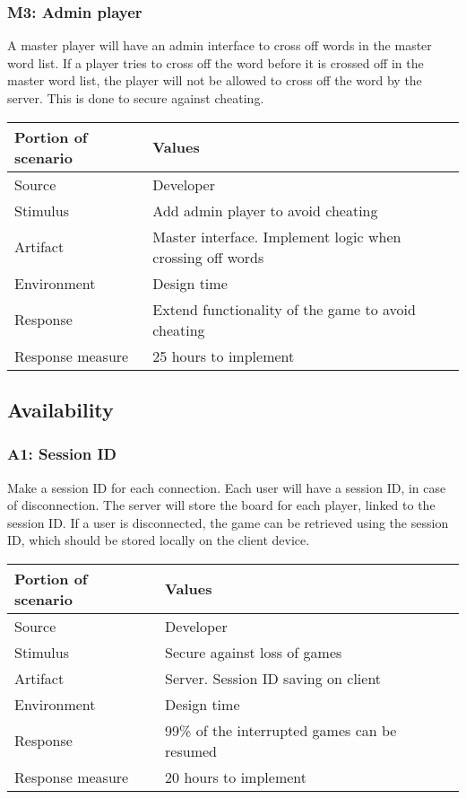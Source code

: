 \subsubsection*{M3: Admin player}
A master player will have an admin interface to cross off words in the master
word list. If a player tries to cross off the word before it is crossed off in
the master word list, the player will not be allowed to cross off the word by
the server. This is done to secure against cheating.

\begin{tabular}{|m{}|m{}|}
\hline
{\bf Portion of scenario} & {\bf Values} \\ \hline
Source & Developer \\ \hline
Stimulus & Add admin player to avoid cheating \\ \hline
Artifact & Master interface. Implement logic when crossing off words \\ \hline
Environment & Design time \\ \hline
Response & Extend functionality of the game to avoid cheating \\ \hline
Response measure & 25 hours to implement \\ \hline
\end{tabular}

\subsection{Availability}

\subsubsection*{A1: Session ID}
Make a session ID for each connection. Each user will have a session ID, in
case of disconnection. The server will store the board for each player, linked
to the session ID\@. If a user is disconnected, the game can be retrieved using
the session ID, which should be stored locally on the client device.

\begin{tabular}{|m{}|m{}|}
\hline
{\bf Portion of scenario} & {\bf Values} \\ \hline
Source &  Developer \\ \hline
Stimulus &  Secure against loss of games \\ \hline
Artifact &  Server. Session ID saving on client \\ \hline
Environment & Design time\\ \hline
Response & 99\% of the interrupted games can be resumed \\ \hline
Response measure & 20 hours to implement \\ \hline
\end{tabular}

